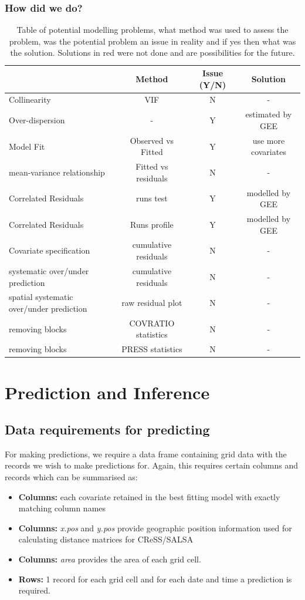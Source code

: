 \begin{frame}
\frametitle{How did we do?}
\begin{table}[h]
\scriptsize
\caption{Table of potential modelling problems, what method was used to assess the problem, was the potential problem an issue in reality and if yes then what was the solution.  Solutions in red were not done and are possibilities for the future.}
\begin{tabular}{l|c|c|c}
\textbf{} & \textbf{Method} & \textbf{Issue (Y/N)} & \textbf{Solution}\\
\hline
Collinearity & VIF & N & -\\
Over-dispersion& - & Y & estimated by GEE\\
Model Fit & Observed vs Fitted & Y & {\color{red} use more covariates}\\
mean-variance relationship & Fitted vs residuals & N & -\\
Correlated Residuals & runs test & Y & modelled by GEE\\
Correlated Residuals & Runs profile & Y & modelled by GEE\\
Covariate specification & cumulative residuals & N & -\\
systematic over/under prediction & cumulative residuals & N & -\\
spatial systematic over/under prediction & raw residual plot & N & -\\
removing blocks & COVRATIO statistics & N & - \\
removing blocks & PRESS statistics & N & - \\
\end{tabular}
\label{tab:fitstats}
\end{table}

\end{frame}
\section{Prediction and Inference}
\subsection{Data requirements for predicting}
For making predictions, we require a data frame containing grid data with the records we wish to make predictions for. Again, this requires certain columns and records which can be summarised as: \\
\begin{itemize}
\item{\textbf{Columns:} each covariate retained in the best fitting model with exactly matching column names}
\item{\textbf{Columns:} \textit{x.pos} and \textit{y.pos} provide geographic position information used for calculating distance matrices for CReSS/SALSA}
\item{\textbf{Columns:} \textit{area} provides the area of each grid cell.}
\item{\textbf{Rows:} 1 record for each grid cell and for each date and time a prediction is required.}
\end{itemize}

